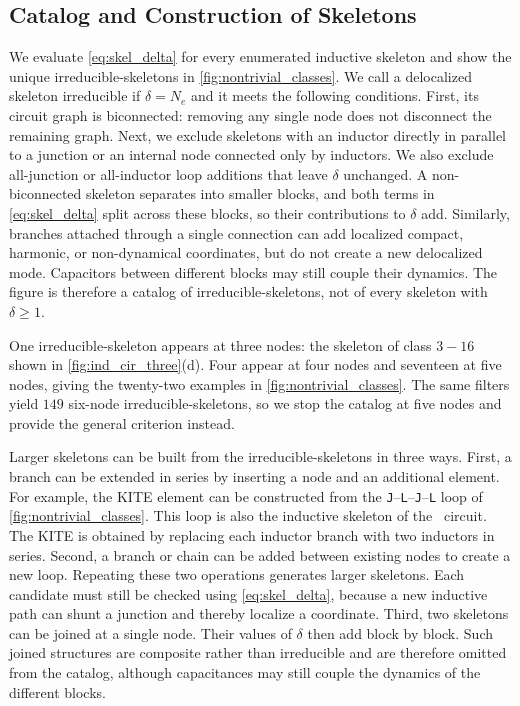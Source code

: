 \subsection{Catalog and Construction of Skeletons}


We evaluate \cref{eq:skel_delta} for every enumerated inductive skeleton and show the unique irreducible-skeletons in \cref{fig:nontrivial_classes}. We call a delocalized skeleton irreducible if $\delta = N_e$ and it meets the following conditions. First, its circuit graph is biconnected: removing any single node does not disconnect the remaining graph. Next, we exclude skeletons with an inductor directly in parallel to a junction or an internal node connected only by inductors. We also exclude all-junction or all-inductor loop additions that leave $\delta$ unchanged. A non-biconnected skeleton separates into smaller blocks, and both terms in \cref{eq:skel_delta} split across these blocks, so their contributions to $\delta$ add. Similarly, branches attached through a single connection can add localized compact, harmonic, or non-dynamical coordinates, but do not create a new delocalized mode. Capacitors between different blocks may still couple their dynamics. The figure is therefore a catalog of irreducible-skeletons, not of every skeleton with $\delta\geq1$.

One irreducible-skeleton appears at three nodes: the skeleton of class $3-16$ shown in \cref{fig:ind_cir_three}(d). Four appear at four nodes and seventeen at five nodes, giving the twenty-two examples in \cref{fig:nontrivial_classes}. The same filters yield $149$ six-node irreducible-skeletons, so we stop the catalog at five nodes and provide the general criterion instead.


Larger skeletons can be built from the irreducible-skeletons in three ways. First, a branch can be extended in series by inserting a node and an additional element. For example, the KITE element \cite{smithSuperconductingCircuitProtected2020b} can be constructed from the \texttt{J}--\texttt{L}--\texttt{J}--\texttt{L} loop of \cref{fig:nontrivial_classes}. This loop is also the inductive skeleton of the \zp\ circuit. The KITE is obtained by replacing each inductor branch with two inductors in series. Second, a branch or chain can be added between existing nodes to create a new loop. Repeating these two operations generates larger skeletons. Each candidate must still be checked using \cref{eq:skel_delta}, because a new inductive path can shunt a junction and thereby localize a coordinate. Third, two skeletons can be joined at a single node. Their values of $\delta$ then add block by block. Such joined structures are composite rather than irreducible and are therefore omitted from the catalog, although capacitances may still couple the dynamics of the different blocks.

